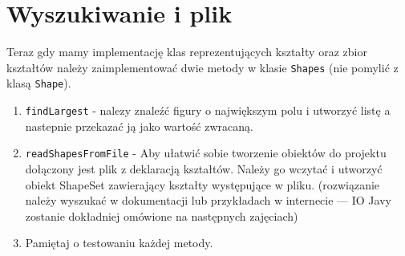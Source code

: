 \documentclass[12pt,letterpaper]{article}
\begin{document}
\section{Wyszukiwanie i plik}
Teraz gdy mamy implementację klas reprezentujących kształty oraz zbior kształtów należy zaimplementować dwie metody w klasie \verb+Shapes+ (nie pomylić z klasą \verb+Shape+). 

\begin{enumerate}
\item \verb+findLargest+ - nalezy znaleźć figury o największym polu i utworzyć listę a nastepnie przekazać ją jako wartość zwracaną.
\item \verb+readShapesFromFile+ - Aby ułatwić sobie tworzenie obiektów do projektu dołączony jest plik z deklaracją kształtów. Należy go wczytać i utworzyć obiekt ShapeSet zawierający kształty występujące w pliku. (rozwiązanie należy wyszukać w dokumentacji lub przykładach w internecie --- IO Javy zostanie dokładniej omówione na następnych zajęciach)
\item Pamiętaj o testowaniu każdej metody.
\end{enumerate}
\end{document}
